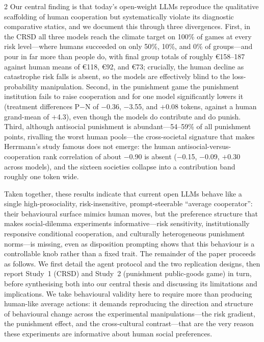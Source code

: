 \documentclass[openacc]{rsproca_new}%
\begin{document}
\begin{multicols}{2}
Our central finding is that today's open-weight LLMs reproduce the qualitative scaffolding of human cooperation but systematically violate its diagnostic comparative statics, and we document this through three divergences. First, in the CRSD all three models reach the climate target on 100\% of games at every risk level---where humans succeeded on only 50\%, 10\%, and 0\% of groups---and pour in far more than people do, with final group totals of roughly €158--187 against human means of €118, €92, and €73; crucially, the human decline as catastrophe risk falls is absent, so the models are effectively blind to the loss-probability manipulation. Second, in the punishment game the punishment institution fails to raise cooperation and for one model significantly lowers it (treatment differences P$-$N of $-$0.36, $-$3.55, and $+$0.08 tokens, against a human grand-mean of $+$4.3), even though the models do contribute and do punish. Third, although antisocial punishment is abundant---54--59\% of all punishment points, rivalling the worst human pools---the cross-societal signature that makes Herrmann's study famous does not emerge: the human antisocial-versus-cooperation rank correlation of about $-$0.90 is absent ($-$0.15, $-$0.09, $+$0.30 across models), and the sixteen societies collapse into a contribution band roughly one token wide.

Taken together, these results indicate that current open LLMs behave like a single high-prosociality, risk-insensitive, prompt-steerable ``average cooperator'': their behavioural surface mimics human moves, but the preference structure that makes social-dilemma experiments informative---risk sensitivity, institutionally responsive conditional cooperation, and culturally heterogeneous punishment norms---is missing, even as disposition prompting shows that this behaviour is a controllable knob rather than a fixed trait. The remainder of the paper proceeds as follows. We first detail the agent protocol and the two replication designs, then report Study~1 (CRSD) and Study~2 (punishment public-goods game) in turn, before synthesising both into our central thesis and discussing its limitations and implications. We take behavioural validity here to require more than producing human-like average actions: it demands reproducing the direction and structure of behavioural change across the experimental manipulations---the risk gradient, the punishment effect, and the cross-cultural contrast---that are the very reason these experiments are informative about human social preferences.


\end{multicols}
\end{document}
